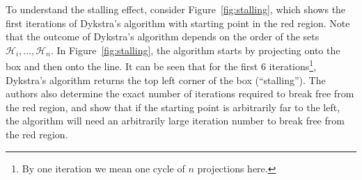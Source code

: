 To understand the stalling effect, consider Figure~\ref{fig:stalling}, which shows the first iterations of Dykstra's algorithm with starting point in the red region. Note that the outcome of Dykstra's algorithm depends on the order of the sets $\mathcal{H}_i,\dots,\mathcal{H}_n$. In Figure~\ref{fig:stalling}, the algorithm starts by projecting onto the box and then onto the line. It can be seen that for the first 6 iterations\footnote{By one iteration we mean one cycle of $n$ projections here.}, Dykstra's algorithm returns the top left corner of the box (``stalling''). The authors also determine the exact number of iterations required to break free from the red region, and show that if the starting point is arbitrarily far to the left, the algorithm will need an arbitrarily large iteration number to break free from the red region.